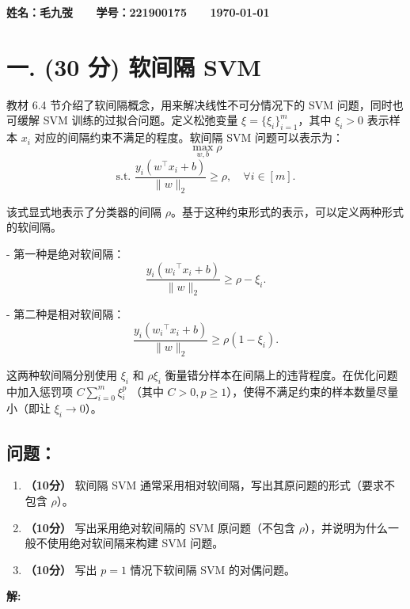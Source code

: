 \documentclass[8pt]{article}
\begin{document}
\textbf{\color{blue} \Large 姓名：毛九弢 \ \ \ 学号：221900175 \ \ \ \today}

\section*{一. (30 分) 软间隔 SVM}
教材 6.4 节介绍了软间隔概念，用来解决线性不可分情况下的 SVM 问题，同时也可缓解 SVM 训练的过拟合问题。定义松弛变量 \( \xi = \{\xi_i\}_{i=1}^m \)，其中 \( \xi_i > 0 \) 表示样本 \( x_i \) 对应的间隔约束不满足的程度。软间隔 SVM 问题可以表示为：
\[
\max_{w, b} \rho
\]
\[
\text{s.t. } \frac{y_i (w^\top x_i + b)}{\|w\|_2} \geq \rho, \quad \forall i \in [m].
\]


该式显式地表示了分类器的间隔 \( \rho \)。基于这种约束形式的表示，可以定义两种形式的软间隔。

- 第一种是绝对软间隔：
  \[
  \frac{y_i ({w_i}^\top x_i + b)}{\|w\|_2} \geq \rho - \xi_i.
  \]

- 第二种是相对软间隔：
  \[
  \frac{y_i ({w_i}^\top x_i + b)}{\|w\|_2} \geq \rho(1 - \xi_i).
  \]

这两种软间隔分别使用 \( \xi_i \) 和 \( \rho \xi_i \) 衡量错分样本在间隔上的违背程度。在优化问题中加入惩罚项 \( C \sum_{i=0}^m \xi_i^p \) （其中 \( C > 0, p \geq 1 \)），使得不满足约束的样本数量尽量小（即让 \( \xi_i \to 0 \)）。

\subsection*{问题：}

\begin{enumerate}
    \item \textbf{（10分）} 软间隔 SVM 通常采用相对软间隔，写出其原问题的形式（要求不包含 \( \rho \)）。
    \item \textbf{（10分）} 写出采用绝对软间隔的 SVM 原问题（不包含 \( \rho \)），并说明为什么一般不使用绝对软间隔来构建 SVM 问题。
    \item \textbf{（10分）} 写出 \( p = 1 \) 情况下软间隔 SVM 的对偶问题。
\end{enumerate}


\textbf{\large 解:}
\end{document}
